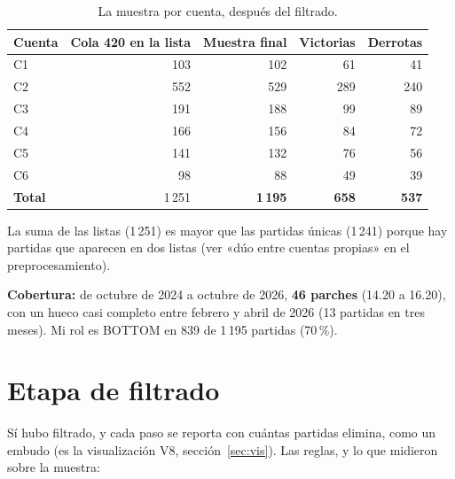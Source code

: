 \documentclass[11pt,letterpaper]{article}
\begin{document}
\begin{table}[H]\centering\small
\caption{La muestra por cuenta, después del filtrado.}
\label{tab:cuentas}
\begin{tabular}{lrrrr}
\toprule
Cuenta & Cola 420 en la lista & Muestra final & Victorias & Derrotas \\
\midrule
C1 & 103 & 102 & 61 & 41 \\
C2 & 552 & 529 & 289 & 240 \\
C3 & 191 & 188 & 99 & 89 \\
C4 & 166 & 156 & 84 & 72 \\
C5 & 141 & 132 & 76 & 56 \\
C6 & 98 & 88 & 49 & 39 \\
\midrule
\textbf{Total} & 1\,251 & \textbf{1\,195} & \textbf{658} & \textbf{537} \\
\bottomrule
\end{tabular}
\end{table}

\noindent La suma de las listas (1\,251) es mayor que las partidas únicas (1\,241)
porque hay partidas que aparecen en dos listas (ver «dúo entre cuentas propias» en el
preprocesamiento).

\noindent \textbf{Cobertura:} de octubre de 2024 a octubre de 2026, \textbf{46 parches}
(14.20 a 16.20), con un hueco casi completo entre febrero y abril de 2026 (13
partidas en tres meses). Mi rol es BOTTOM en 839 de 1\,195 partidas (70\,\%).

\section{Etapa de filtrado}

Sí hubo filtrado, y cada paso se reporta con cuántas partidas elimina, como un
embudo (es la visualización V8, sección~\ref{sec:vis}). Las reglas, y lo que midieron
sobre la muestra:
\end{document}

